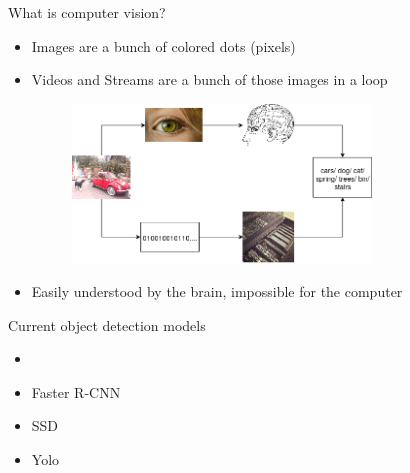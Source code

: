 \begin{frame}{What is computer vision?}
    \begin{itemize}
        \item Images are a bunch of colored dots (pixels)
        \item Videos and Streams are a bunch of those images in a loop
        \begin{figure}
            \begin{center}
                \includegraphics[width=0.75\textwidth]{images/Recoginition_Process.png}
            \end{center}
        \end{figure}
        \item Easily understood by the brain, impossible for the computer 
    \end{itemize}
\end{frame}

\begin{frame}{Current object detection models}
    \begin{itemize}
        \item 
        \item Faster R-CNN
        \item SSD
        \item Yolo
    \end{itemize}
\end{frame}
